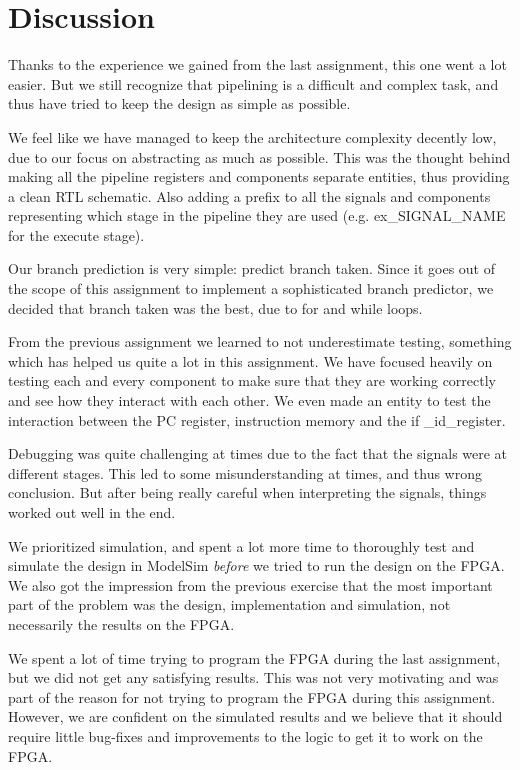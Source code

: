 \section{Discussion}\label{discussion}
Thanks to the experience we gained from the last assignment, this one went a 
lot easier. But we still recognize that pipelining is a difficult and complex 
task, and thus have tried to keep the design as simple as possible. 

We feel like we have managed to keep the architecture complexity decently low,
due to our focus on abstracting as much as possible. This was the thought
behind making all the pipeline registers and components separate entities, 
thus providing a clean RTL schematic. Also adding a prefix to all the signals 
and components representing which stage in the pipeline they are used (e.g. 
ex\_SIGNAL\_NAME for the execute stage). 

Our branch prediction is very simple: predict branch taken. Since it goes out 
of the scope of this assignment to implement a sophisticated branch 
predictor, we decided that branch taken was the best, due to for and while 
loops.  

From the previous assignment we learned to not underestimate testing, 
something which has helped us quite a lot in this assignment. We have focused 
heavily on testing each and every component to make sure that they are
 working 
correctly and see how they interact with each other. We even made an entity to test the interaction between the PC register, instruction memory and the if
\_id\_register. 

Debugging was quite challenging at times due to the fact that the signals 
were at different stages. This led to some misunderstanding at times, and 
thus wrong conclusion. But after being really careful when interpreting the 
signals, things worked out well in the end.

We prioritized simulation, and spent a lot more time to thoroughly test 
and simulate the design in ModelSim \textit{before} we tried to run
the design on the FPGA. We also got the impression from the previous exercise
that the most important part of the problem was the design, implementation and
simulation, not necessarily the results on the FPGA.

We spent a lot of time trying to program the FPGA during the last assignment, but
we did not get any satisfying results. This was not very motivating and was part
of the reason for not trying to program the FPGA during this assignment. 
However, we are confident on the simulated results and we believe that it should
require little bug-fixes and improvements to the logic to get it to work
on the FPGA. 
